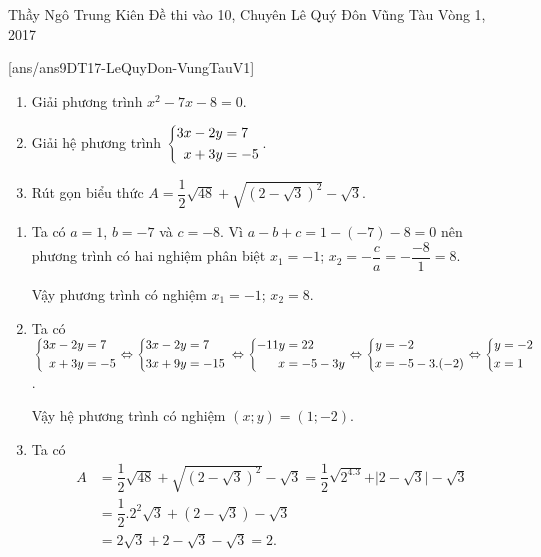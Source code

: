 \begin{name}
{Thầy  Ngô Trung Kiên}
{Đề thi vào 10, Chuyên Lê Quý Đôn Vũng Tàu Vòng 1, 2017}
\end{name}
\setcounter{ex}{0}
[ans/ans9DT17-LeQuyDon-VungTauV1]
\begin{ex}%
\hfill
\begin{enumerate}
    \item Giải phương trình $x^2-7x-8=0$.
    \item Giải hệ phương trình $\left\{\begin{aligned}3x-2y&=7\\x+3y&=-5\end{aligned}\right.$.
    \item Rút gọn biểu thức $A=\dfrac{1}{2}\sqrt{48}+\sqrt{\left(2-\sqrt{3}\right)^2}-\sqrt{3}$.
\end{enumerate}
\loigiai
{
\begin{enumerate}
    \item Ta có $a=1$, $b=-7$ và $c=-8$. Vì $a-b+c=1-(-7)-8=0$ nên phương trình có hai nghiệm phân biệt $x_1=-1$; $x_2=-\dfrac{c}{a}=-\dfrac{-8}{1}=8$.
    \par Vậy phương trình có nghiệm $x_1=-1$; $x_2=8$.
    \item Ta có $\left\{\begin{aligned}3x-2y&=7\\x+3y&=-5\end{aligned}\right. \Leftrightarrow \left\{\begin{aligned}3x-2y&=7\\3x+9y&=-15\end{aligned}\right.\\
    \Leftrightarrow \left\{\begin{aligned}-11y&=22\\x&=-5-3y\end{aligned}\right.
    \Leftrightarrow \left\{\begin{aligned}y&=-2\\x&=-5-3.(-2)\end{aligned}\right. \Leftrightarrow \left\{\begin{aligned}y&=-2\\x&=1\end{aligned}\right.$.
    \par Vậy hệ phương trình có nghiệm $(x;y)=(1;-2)$.
    \item Ta có
    \begin{align*}
    A&=\dfrac{1}{2}\sqrt{48}+\sqrt{\left(2-\sqrt{3}\right)^2}-\sqrt{3}=\dfrac{1}{2}\sqrt{2^4.3}+\vert 2-\sqrt{3} \vert -\sqrt{3}\\
    &=\dfrac{1}{2}.2^2\sqrt{3}+(2-\sqrt{3})-\sqrt{3}\\
    &=2\sqrt{3}+2-\sqrt{3}-\sqrt{3}=2.
    \end{align*}
\end{enumerate}
    }
\end{ex}

